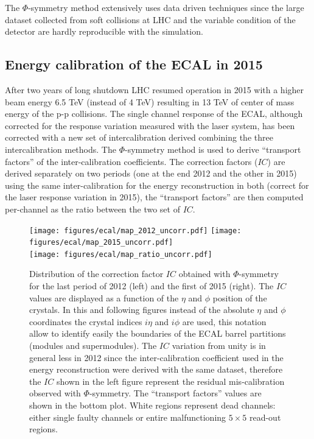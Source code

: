 The $\Phi$-symmetry method extensively uses data driven techniques since the large dataset collected from soft collisions
at LHC and the variable condition of the detector are hardly reproducible with the simulation.

\subsection{Energy calibration of the ECAL in 2015}
\label{sec:calib_2015}

After two years of long shutdown LHC resumed operation in 2015 with a higher beam energy 6.5 TeV (instead of 4 TeV) resulting
in 13 TeV of center of mass energy of the p-p collisions. The single channel response of the ECAL, although corrected
for the response variation measured with the laser system, has been corrected with a new set of intercalibration
derived combining the three intercalibration methods. The $\Phi$-symmetry method is used to derive ``transport factors''
of the inter-calibration coefficients. The correction factors ($IC$) are derived separately on two periods
(one at the end 2012 and the other in 2015) using the same inter-calibration for the energy reconstruction in both
(correct for the laser response variation in 2015), the ``transport factors'' are then computed per-channel as the
ratio between the two set of $IC$.

\begin{figure}[h!]
  \centering
  \texttt{[image: figures/ecal/map\_2012\_uncorr.pdf]}
  \texttt{[image: figures/ecal/map\_2015\_uncorr.pdf]}\\
  \texttt{[image: figures/ecal/map\_ratio\_uncorr.pdf]}
  \caption{Distribution of the correction factor $IC$ obtained with $\Phi$-symmetry for the last
    period of 2012 (left) and the first of 2015 (right). The $IC$ values are displayed as a function
    of the $\eta$ and $\phi$ position of the crystals. In this and following figures instead of the absolute
    $\eta$ and $\phi$ coordinates the crystal indices $i\eta$ and $i\phi$ are used, this notation
    allow to identify easily the boundaries of the ECAL barrel partitions (modules and supermodules).
    The $IC$ variation from unity is in general less in 2012 since the inter-calibration coefficient used
    in the energy reconstruction were derived with the same dataset, therefore the $IC$ shown in the left figure
    represent the residual mis-calibration observed with $\Phi$-symmetry. The ``transport factors'' values
    are shown in the bottom plot. White regions represent dead channels: either single faulty channels or
  entire malfunctioning $5\times 5$ read-out regions.}
  \label{fig:ic_phisym}
\end{figure}

